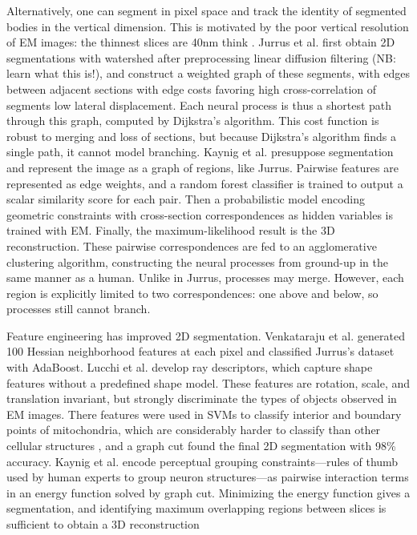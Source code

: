 \documentclass[draft]{article}
\begin{document}
Alternatively, one can segment in pixel space and track the identity of segmented bodies in the vertical dimension. This is motivated by the poor vertical resolution of EM images: the thinnest slices are 40nm think \cite{Kaynig2010b, Briggman2006}. Jurrus et al. \cite{Jurrus2008} first obtain 2D segmentations with watershed after preprocessing linear diffusion filtering (NB: learn what this is!), and construct a weighted graph of these segments, with edges between adjacent sections with edge costs favoring high cross-correlation of segments low lateral displacement. Each neural process is thus a shortest path through this graph, computed by Dijkstra's algorithm. This cost function is robust to merging and loss of sections, but because Dijkstra's algorithm finds a single path, it cannot model branching. Kaynig et al. \cite{Kaynig2010a} presuppose segmentation and represent the image as a graph of regions, like Jurrus. Pairwise features are represented as edge weights, and a random forest classifier is trained to output a scalar similarity score for each pair. Then a probabilistic model encoding geometric constraints with cross-section correspondences as hidden variables is trained with EM. Finally, the maximum-likelihood result is the 3D reconstruction. These pairwise correspondences are fed to an agglomerative clustering algorithm, constructing the neural processes from ground-up in the same manner as a human. Unlike in Jurrus, processes may merge. However, each region is explicitly limited to two correspondences: one above and below, so processes still cannot branch.

Feature engineering has improved 2D segmentation. Venkataraju et al. \cite{Venkataraju2009} generated 100 Hessian neighborhood features at each pixel and classified Jurrus's dataset with AdaBoost. Lucchi et al. \cite{Lucchi2010} develop ray descriptors, which capture shape features without a predefined shape model. These features are rotation, scale, and translation invariant, but strongly discriminate the types of objects observed in EM images. There features were used in SVMs to classify interior and boundary points of mitochondria, which are considerably harder to classify than other cellular structures \cite{Kaynig2010b}, and a graph cut found the final 2D segmentation with 98\% accuracy. Kaynig et al. encode perceptual grouping constraints---rules of thumb used by human experts to group neuron structures---as pairwise interaction terms in an energy function solved by graph cut. Minimizing the energy function gives a segmentation, and identifying maximum overlapping regions between slices is sufficient to obtain a 3D reconstruction 
\end{document}
